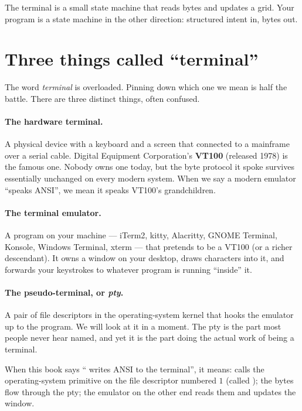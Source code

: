 \begin{idea}
The terminal is a small state machine that reads bytes and updates a
grid. Your program is a state machine in the other direction:
structured intent in, bytes out.
\end{idea}

\section{Three things called ``terminal''}

The word \emph{terminal} is overloaded. Pinning down which one we mean
is half the battle. There are three distinct things, often confused.

\paragraph{The hardware terminal.}
A physical device with a keyboard and a screen that connected to a
mainframe over a serial cable. Digital Equipment Corporation's
\textbf{VT100} (released 1978) is the famous one. Nobody owns one
today, but the byte protocol it spoke survives essentially unchanged
on every modern system. When we say a modern emulator ``speaks
ANSI'', we mean it speaks VT100's grandchildren.

\paragraph{The terminal emulator.}
A program on your machine --- iTerm2, kitty, Alacritty, GNOME
Terminal, Konsole, Windows Terminal, xterm --- that pretends to be a
VT100 (or a richer descendant). It owns a window on your desktop,
draws characters into it, and forwards your keystrokes to whatever
program is running ``inside'' it.

\paragraph{The pseudo-terminal, or \emph{pty}.}
A pair of file descriptors in the operating-system kernel that hooks
the emulator up to the program. We will look at it in a moment. The
pty is the part most people never hear named, and yet it is the part
doing the actual work of being a terminal.

When this book says ``\maya{} writes ANSI to the terminal'', it means:
\maya{} calls the operating-system primitive  on the file
descriptor numbered $1$ (called ); the bytes flow through
the pty; the emulator on the other end reads them and updates the
window.

